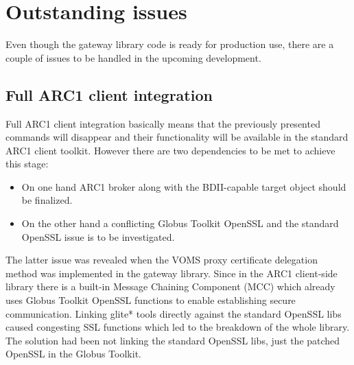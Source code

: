 \documentclass{article}
\begin{document}
\section{Outstanding issues}
\label{Outstanding issues}
Even though the gateway library code is ready for production use, there are a couple of issues to be handled in the upcoming development.
\subsection{Full ARC1 client integration}
Full ARC1 client integration basically means that the previously presented commands will disappear and their functionality will be available in the standard ARC1 client toolkit. However there are two dependencies to be met to achieve this stage:
\begin{itemize}
\item On one hand ARC1 broker along with the BDII-capable target object should be finalized.
\item On the other hand a conflicting Globus Toolkit OpenSSL and the standard OpenSSL issue is to be investigated.
\end{itemize}
The latter issue was revealed when the VOMS proxy certificate delegation method was implemented in the gateway library. Since in the ARC1 client-side library there is a built-in Message Chaining Component (MCC) which already uses Globus Toolkit OpenSSL functions to enable establishing secure communication. Linking glite* tools directly against the standard OpenSSL libs caused congesting SSL functions which led to the breakdown of the whole library. The solution had been not linking the standard OpenSSL libs, just the patched OpenSSL in the Globus Toolkit.
\end{document}
